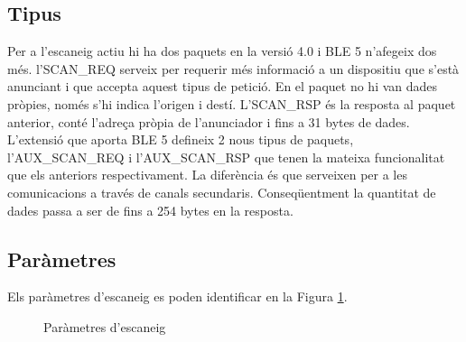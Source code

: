 \subsection{Tipus}
Per a l'escaneig actiu hi ha dos paquets en la versió 4.0 i BLE 5 n'afegeix dos més.
l'SCAN\_REQ serveix per requerir més informació a un dispositiu que s'està anunciant i que accepta aquest tipus de petició.
En el paquet no hi van dades pròpies, només s'hi indica l'origen i destí.
L'SCAN\_RSP és la resposta al paquet anterior, conté l'adreça pròpia de l'anunciador i fins a 31 bytes de dades.
L'extensió que aporta BLE 5 defineix 2 nous tipus de paquets, l'AUX\_SCAN\_REQ i l'AUX\_SCAN\_RSP que tenen la mateixa funcionalitat que els anteriors respectivament.
La diferència és que serveixen per a les comunicacions a través de canals secundaris.
Conseqüentment la quantitat de dades passa a ser de fins a 254 bytes en la resposta.

\subsection{Paràmetres}
Els paràmetres d'escaneig es poden identificar en la Figura \ref{fig:escaneig_canals}.

\begin{figure}[!h]
	\begin{center}
		\begin{subfigmatrix}{1}
		\end{subfigmatrix}
	\end{center}
	\caption{Paràmetres d'escaneig \cite{advertisment_params} }
	\label{fig:escaneig_canals}
\end{figure}

